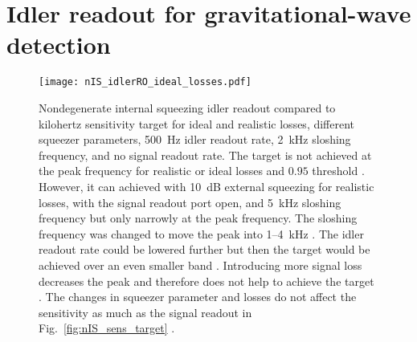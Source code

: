 \section{Idler readout for gravitational-wave detection}


\begin{figure}
	\centering
	\texttt{[image: nIS\_idlerRO\_ideal\_losses.pdf]}
	\caption{   Nondegenerate internal squeezing idler readout compared to kilohertz sensitivity target for ideal and realistic losses, different squeezer parameters, 500~Hz idler readout rate, 2~kHz sloshing frequency, and no signal readout rate. The target is not achieved at the peak frequency for realistic or ideal losses and $0.95$ threshold . However, it can achieved with 10~dB external squeezing  for realistic losses, with the signal readout port open, and 5~kHz sloshing frequency but only narrowly at the peak frequency. The sloshing frequency was changed to move the peak into 1--4~kHz . The idler readout rate could be lowered further but then the target would be achieved over an even smaller band . Introducing more signal loss decreases the peak and therefore does not help to achieve the target . The changes in squeezer parameter and losses do not affect the sensitivity as much as the signal readout in Fig.~\ref{fig:nIS_sens_target} .}
	\label{fig:nIS_idlerRO_ideal_losses}
\end{figure}

